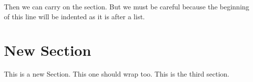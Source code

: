 \documentclass{article}
\begin{document}
\begin{multicols}{2}
Then we can carry on the section. But we must be careful because the beginning of this line will be indented as it is after a list.

\columnbreak

\section{New Section}
This is a new Section. This one should wrap too. This is the third section.

\end{multicols}

\end{document}
